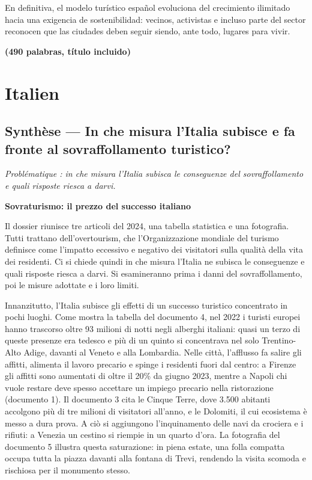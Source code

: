 \documentclass[11pt,a4paper]{article}
\begin{document}
En definitiva, el modelo turístico español evoluciona del crecimiento ilimitado hacia una exigencia de sostenibilidad: vecinos, activistas e incluso parte del sector reconocen que las ciudades deben seguir siendo, ante todo, lugares para vivir.

\textbf{(490 palabras, título incluido)}

\hypertarget{italien}{%
\section{Italien}\label{italien}}

\hypertarget{synthuxe8se-in-che-misura-litalia-subisce-e-fa-fronte-al-sovraffollamento-turistico}{%
\subsection{Synthèse --- In che misura l'Italia subisce e fa fronte al sovraffollamento turistico?}\label{synthuxe8se-in-che-misura-litalia-subisce-e-fa-fronte-al-sovraffollamento-turistico}}

\emph{Problématique : in che misura l'Italia subisca le conseguenze del sovraffollamento e quali risposte riesca a darvi.}

\textbf{Sovraturismo: il prezzo del successo italiano}

Il dossier riunisce tre articoli del 2024, una tabella statistica e una fotografia. Tutti trattano dell'overtourism, che l'Organizzazione mondiale del turismo definisce come l'impatto eccessivo e negativo dei visitatori sulla qualità della vita dei residenti. Ci si chiede quindi in che misura l'Italia ne subisca le conseguenze e quali risposte riesca a darvi. Si esamineranno prima i danni del sovraffollamento, poi le misure adottate e i loro limiti.

Innanzitutto, l'Italia subisce gli effetti di un successo turistico concentrato in pochi luoghi. Come mostra la tabella del documento 4, nel 2022 i turisti europei hanno trascorso oltre 93 milioni di notti negli alberghi italiani: quasi un terzo di queste presenze era tedesco e più di un quinto si concentrava nel solo Trentino-Alto Adige, davanti al Veneto e alla Lombardia. Nelle città, l'afflusso fa salire gli affitti, alimenta il lavoro precario e spinge i residenti fuori dal centro: a Firenze gli affitti sono aumentati di oltre il 20\% da giugno 2023, mentre a Napoli chi vuole restare deve spesso accettare un impiego precario nella ristorazione (documento 1). Il documento 3 cita le Cinque Terre, dove 3.500 abitanti accolgono più di tre milioni di visitatori all'anno, e le Dolomiti, il cui ecosistema è messo a dura prova. A ciò si aggiungono l'inquinamento delle navi da crociera e i rifiuti: a Venezia un cestino si riempie in un quarto d'ora. La fotografia del documento 5 illustra questa saturazione: in piena estate, una folla compatta occupa tutta la piazza davanti alla fontana di Trevi, rendendo la visita scomoda e rischiosa per il monumento stesso.
\end{document}
